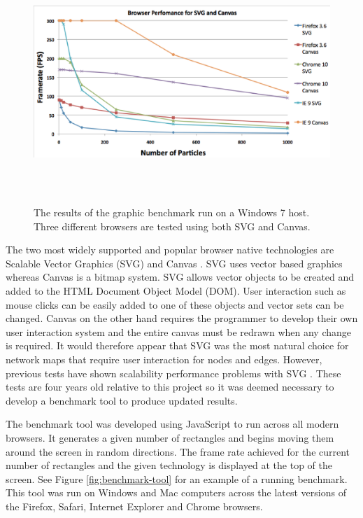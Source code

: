 \documentclass[11pt, a4paper]{report}
\begin{document}
\begin{figure}
\centering
\includegraphics[width=170mm,height=91.67mm]{assets/benchmark-graph.eps}
\caption{The results of the graphic benchmark run on a Windows 7 host. Three
different browsers are tested using both SVG and Canvas.}
\label{fig:benchmark-graph}
\end{figure}

The two most widely supported and popular browser native technologies are
Scalable Vector Graphics (SVG) \cite{Ferraiolo_2003} and Canvas
\cite{Canvas_website}. SVG uses vector based graphics whereas Canvas is a bitmap
system. SVG allows vector objects to be created and added to the HTML Document
Object Model (DOM). User interaction such as mouse clicks can be easily added to
one of these objects and vector sets can be changed. Canvas on the other hand
requires the programmer to develop their own user interaction system and the
entire canvas must be redrawn when any change is required. It would therefore
appear that SVG was the most natural choice for network maps that require user
interaction for nodes and edges. However, previous tests have shown scalability
performance problems with SVG \cite{Johnson_2008}. These tests are four years
old relative to this project so it was deemed necessary to develop a benchmark
tool to produce updated results.

The benchmark tool was developed using JavaScript to run across all modern
browsers. It generates a given number of rectangles and begins moving them
around the screen in random directions. The frame rate achieved for the current
number of rectangles and the given technology is displayed at the top of the
screen. See Figure \ref{fig:benchmark-tool} for an example of a running
benchmark. This tool was run on Windows and Mac computers across the latest
versions of the Firefox, Safari, Internet Explorer and Chrome browsers. 
\end{document}
